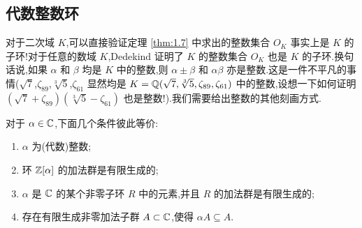 \subsection{代数整数环}\label{sec:ch1-s2-2}

对于二次域 $K$,可以直接验证定理 \ref{thm:1.7} 中求出的整数集合 $O_K$ 事实上是 $K$ 的子环!对于任意的数域 $K$,Dedekind 证明了 $K$ 的整数集合 $O_K$ 也是 $K$ 的子环.换句话说,如果 $\alpha$ 和 $\beta$ 均是 $K$ 中的整数,则 $\alpha\pm\beta$ 和 $\alpha\beta$ 亦是整数.这是一件不平凡的事情($\sqrt{7}$,$\zeta_{89}$,$\sqrt[3]{5}$,$\zeta_{61}$ 显然均是 $K=\mathbb{Q}(\sqrt{7},\sqrt[3]{5},\zeta_{89},\zeta_{61})$ 中的整数,设想一下如何证明 $(\sqrt{7}+\zeta_{89})(\sqrt[3]{5}-\zeta_{61})$ 也是整数!).我们需要给出整数的其他刻画方式.

\begin{theorem}\label{thm:1.8}
对于 $\alpha\in\mathbb{C}$,下面几个条件彼此等价:
\begin{enumerate}[(1)]
  \item $\alpha$ 为(代数)整数;
  \item 环 $\mathbb{Z}[\alpha]$ 的加法群是有限生成的;
  \item $\alpha$ 是 $\mathbb{C}$ 的某个非零子环 $R$ 中的元素,并且 $R$ 的加法群是有限生成的;
  \item 存在有限生成非零加法子群 $A\subset\mathbb{C}$,使得 $\alpha A\subseteq A$.
\end{enumerate}
\end{theorem}

